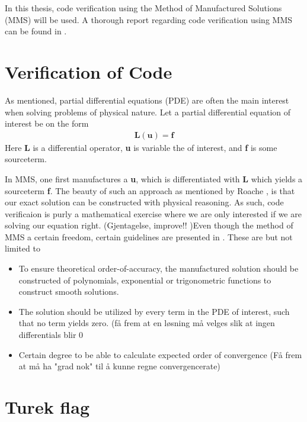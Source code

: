 In this thesis, code verification using the Method of Manufactured Solutions (MMS) will be used.  A thorough report regarding code verification using  MMS can be found in \cite{Biggs}.


\section{Verification of Code}
As mentioned, partial differential equations (PDE) are often the main interest when solving problems of physical nature.
Let a  partial differential equation of interest be on the form
\begin{align*}
\textbf{L}(\textbf{u}) = \textbf{f}
\end{align*}
Here \textbf{L} is a differential operator, \textbf{u} is variable the of interest, and \textbf{f} is some sourceterm.

In MMS, one first manufactures a \textbf{u}, which is differentiated with \textbf{L} which yields a sourceterm  \textbf{f}. The beauty of such an approach as mentioned by Roache \cite{Roache2002}, is that our exact solution can be constructed with physical reasoning. As such, code verificaion is purly a mathematical exercise where we are only interested if we are solving our equation right. (Gjentagelse, improve!! )Even though the method of MMS a certain freedom, certain guidelines are presented in \cite{Biggs}. These are but not limited to

\begin{itemize}
\item To ensure theoretical order-of-accuracy, the manufactured solution should be constructed of polynomials, exponential or trigonometric functions to construct smooth solutions.
\item The solution should be utilized by every term in the PDE of interest, such that no term yields zero.
(få frem at en løsning må velges slik at ingen differentials blir 0
\item Certain degree to be able to calculate expected order of convergence (Få frem at må ha "grad nok" til å kunne regne convergencerate) 
\end{itemize}

                                                                                                                                                   
\section{Turek flag}